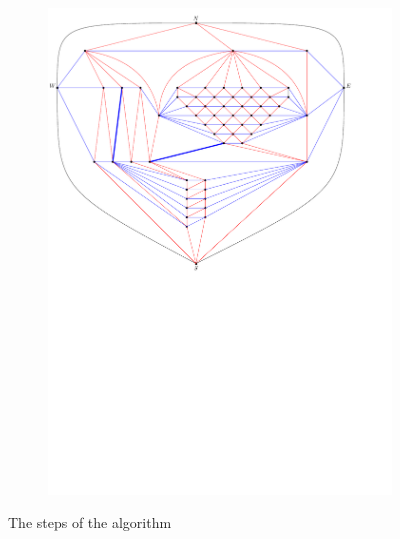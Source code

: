\begin{figure}
\begin{subfigure}[b]{.9 \textwidth}
      \includegraphics[width=\textwidth]{examples/img/vertWorstCase/subdiv1}
      \caption{}
      \label{fig:ex:vert:subdiv1}
    \end{subfigure}
  \caption{The steps of the algorithm}
  \label{}
\end{figure}



